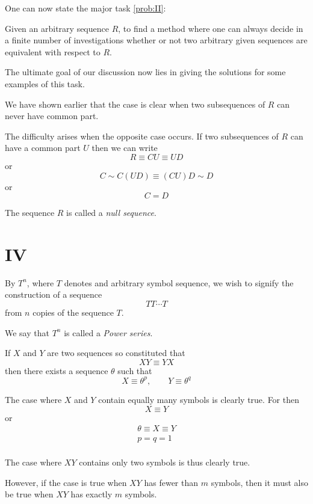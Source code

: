 \bigskip

One can now state the major task \ref{prob:II}:

\begin{problem}
Given an arbitrary sequence $R$, to find a method where one can
always decide in a finite number of investigations whether or not two
arbitrary given sequences are equivalent with respect to $R$.
\label{prob:II}
\end{problem}

The ultimate goal of our discussion now lies in giving the solutions
for some examples of this task.

We have shown earlier that the case is clear when two subsequences of
$R$ can never have common part.

The difficulty arises when the opposite case occurs.  If two
subsequences of $R$ can have a common part $U$ then we can write
$$R \equiv CU \equiv UD$$
or
$$C \sim C(UD) \equiv (CU)D \sim D$$
or 
$$C = D$$

The sequence $R$ is called a \emph{null sequence}.


\section{IV}

By $T^n$, where $T$ denotes and arbitrary symbol sequence, we wish to
signify the construction of a sequence 
$$TT \cdots T$$
from $n$ copies of the sequence $T$.

We say that $T^n$ is called a \emph{Power series}.

\medskip

If $X$ and $Y$ are two sequences so constituted that
$$XY \equiv YX$$ 
then there exists a sequence $\theta$ such that
$$X \equiv \theta^p, \qquad Y \equiv \theta^q$$

The case where $X$ and $Y$ contain equally many symbols is clearly
true.  For then
$$X \equiv Y$$
or 
\begin{gather*}
\theta \equiv X \equiv Y\\
p = q = 1\\
\end{gather*}

The case where $XY$ contains only two symbols is thus clearly true.

However, if the case is true when $XY$ has fewer than $m$ symbols,
then it must also be true when $XY$ has exactly $m$ symbols.

